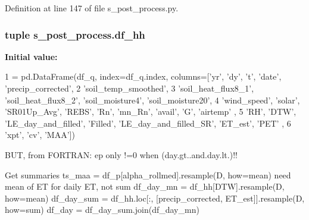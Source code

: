 Definition at line 147 of file s\+\_\+post\+\_\+process.\+py.

\hypertarget{namespaces__post__process_aecff5690de1809fbb2de43b409ab9577}{}
\subsubsection[{df\+\_\+hh}]{\setlength{\rightskip}{0pt plus 5cm}tuple s\+\_\+post\+\_\+process.\+df\+\_\+hh}\label{namespaces__post__process_aecff5690de1809fbb2de43b409ab9577}
{\bfseries Initial value\+:}
\begin{DoxyCode}
1 = pd.DataFrame(df\_q, index=df\_q.index, columns=[\textcolor{stringliteral}{'yr'}, \textcolor{stringliteral}{'dy'}, \textcolor{stringliteral}{'t'}, \textcolor{stringliteral}{'date'}, \textcolor{stringliteral}{'precip\_corrected'},
2                         \textcolor{stringliteral}{'soil\_temp\_smoothed'},
3                         \textcolor{stringliteral}{'soil\_heat\_flux8\_1'}, \textcolor{stringliteral}{'soil\_heat\_flux8\_2'}, \textcolor{stringliteral}{'soil\_moisture4'}, \textcolor{stringliteral}{'soil\_moisture20'},
4                         \textcolor{stringliteral}{'wind\_speed'}, \textcolor{stringliteral}{'solar'}, \textcolor{stringliteral}{'SR01Up\_Avg'}, \textcolor{stringliteral}{'REBS'}, \textcolor{stringliteral}{'Rn'}, \textcolor{stringliteral}{'mn\_Rn'}, \textcolor{stringliteral}{'avail'}, \textcolor{stringliteral}{'G'}, \textcolor{stringliteral}{'airtemp'}
      ,
5                         \textcolor{stringliteral}{'RH'}, \textcolor{stringliteral}{'DTW'}, \textcolor{stringliteral}{'LE\_day\_and\_filled'}, \textcolor{stringliteral}{'Filled'}, \textcolor{stringliteral}{'LE\_day\_and\_filled\_SR'}, \textcolor{stringliteral}{'ET\_est'}, \textcolor{stringliteral}{'PET'}
      ,
6                         \textcolor{stringliteral}{'xpt'}, \textcolor{stringliteral}{'cv'}, \textcolor{stringliteral}{'MAA'}])
\end{DoxyCode}


B\+U\+T, from F\+O\+R\+T\+R\+A\+N\+: ep only !=0 when (day.\+gt..\+and.\+day.\+lt.)!! 

Get summaries ts\+\_\+maa = df\+\_\+p\mbox{[}\textquotesingle{}alpha\+\_\+rollmed\textquotesingle{}\mbox{]}.resample(\textquotesingle{}D\textquotesingle{}, how=\textquotesingle{}mean\textquotesingle{}) need mean of E\+T for daily E\+T, not sum df\+\_\+day\+\_\+mn = df\+\_\+hh\mbox{[}\textquotesingle{}D\+T\+W\textquotesingle{}\mbox{]}.resample(\textquotesingle{}D\textquotesingle{}, how=\textquotesingle{}mean\textquotesingle{}) df\+\_\+day\+\_\+sum = df\+\_\+hh.\+loc\mbox{[}\+:, \mbox{[}\textquotesingle{}precip\+\_\+corrected\textquotesingle{}, \textquotesingle{}E\+T\+\_\+est\textquotesingle{}\mbox{]}\mbox{]}.resample(\textquotesingle{}D\textquotesingle{}, how=\textquotesingle{}sum\textquotesingle{}) df\+\_\+day = df\+\_\+day\+\_\+sum.\+join(df\+\_\+day\+\_\+mn) 

